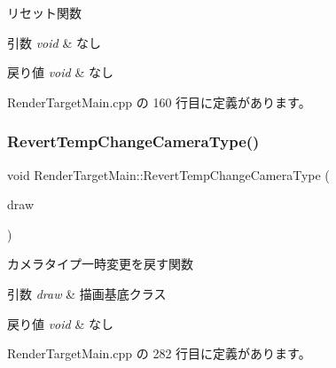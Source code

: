 リセット関数 


\begin{DoxyParams}{引数}
{\em void} & なし \\
\hline
\end{DoxyParams}

\begin{DoxyRetVals}{戻り値}
{\em void} & なし \\
\hline
\end{DoxyRetVals}


 Render\+Target\+Main.\+cpp の 160 行目に定義があります。

\mbox{\label{class_render_target_main_aa9e36ecc466757f0d463cf7f638b197a}} 
\subsubsection{\texorpdfstring{Revert\+Temp\+Change\+Camera\+Type()}{RevertTempChangeCameraType()}}
{\footnotesize\ttfamily void Render\+Target\+Main\+::\+Revert\+Temp\+Change\+Camera\+Type (\begin{DoxyParamCaption}\item[{\mbox{\hyperlink{class_draw_base}{Draw\+Base}} $\ast$}]{draw }\end{DoxyParamCaption})\hspace{0.3cm}{\ttfamily [private]}}



カメラタイプ一時変更を戻す関数 


\begin{DoxyParams}{引数}
{\em draw} & 描画基底クラス \\
\hline
\end{DoxyParams}

\begin{DoxyRetVals}{戻り値}
{\em void} & なし \\
\hline
\end{DoxyRetVals}


 Render\+Target\+Main.\+cpp の 282 行目に定義があります。

\mbox{\label{class_render_target_main_ae37304ee8e63056e4a1d1b956bcd47b4}} 
